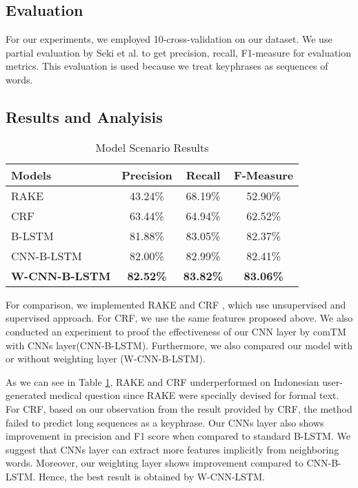 \documentclass[sigconf]{acmart}
\begin{document}
\subsection{Evaluation}
For our experiments, we employed 10-cross-validation on our dataset. We use partial evaluation by Seki et al. \cite{seki2003probabilistic} to get precision, recall, F1-measure for evaluation metrics. This evaluation is used because we treat keyphrases as sequences of words.  


\subsection{Results and Analyisis}
\begin{table}
	\caption{Model Scenario Results}
	\label{tab:model_scenario}
	\begin{tabular}{lccc}
		\toprule
		Models&Precision&Recall&F-Measure\\
		\midrule
		RAKE & 43.24\% & 68.19\% & 52.90\% \\
		
		CRF & 63.44\% & 64.94\% & 62.52\% \\
		\midrule
		B-LSTM & 81.88\% & 83.05\% & 82.37\% \\
		
		CNN-B-LSTM & 82.00\% & 82.99\% & 82.41\% \\
		
		\textbf{W-CNN-B-LSTM} & \textbf{82.52\%} & \textbf{83.82\%} & \textbf{83.06\%} \\
		\bottomrule
	\end{tabular}
\end{table}


For comparison, we implemented RAKE \cite{rake} and CRF \cite{cao2010automatically}, which use unsupervised and supervised approach. For CRF, we use the same features proposed above. We also conducted an experiment to proof the effectiveness of our CNN layer by comTM with CNNs layer(CNN-B-LSTM). Furthermore, we also compared our model with or without weighting layer (W-CNN-B-LSTM).

As we can see in Table \ref{tab:model_scenario}, RAKE and CRF underperformed on Indonesian user-generated medical question since RAKE were specially devised for formal text. For CRF, based on our observation from the result provided by CRF, the method failed to predict long sequences as a keyphrase. Our CNNs layer also shows improvement in precision and F1 score when compared to standard B-LSTM. We suggest that CNNs layer can extract more features implicitly from neighboring words. Moreover, our weighting layer shows improvement compared to CNN-B-LSTM. Hence, the best result is obtained by W-CNN-LSTM.
\end{document}
